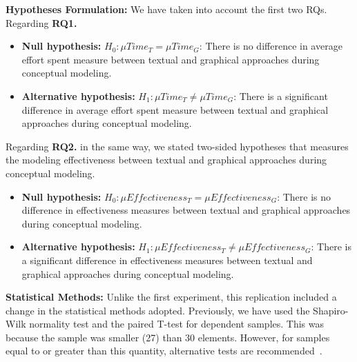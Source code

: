 \textbf{Hypotheses Formulation:} 
We have taken into account the first two RQs. 
Regarding \textbf{RQ1.} 
\begin{itemize}
    \item \textbf{Null hypothesis:} $H_0 : \mu Time_T = \mu Time_G$: There is no difference in average effort spent measure between textual and graphical approaches during conceptual modeling.
    \item \textbf{Alternative hypothesis:} $H_{1} : \mu Time_T \neq \mu Time_G$: There is a significant difference in average effort spent measure between textual and graphical approaches during conceptual modeling.
\end{itemize}
Regarding \textbf{RQ2.} 
in the same way, we stated two-sided hypotheses that measures the modeling effectiveness between textual and graphical approaches during conceptual modeling.
\begin{itemize}
    \item \textbf{Null hypothesis:} $H_0 : \mu Effectiveness_T = \mu Effectiveness_G$: There is no difference in effectiveness measures between textual and graphical approaches during conceptual modeling.
    \item \textbf{Alternative hypothesis:} $H_{1} : \mu Effectiveness_T \neq \mu Effectiveness_G$: There is a significant difference in effectiveness measures between textual and graphical approaches during conceptual modeling.
\end{itemize}

\textbf{Statistical Methods:} Unlike the first experiment, this replication included a change in the statistical methods adopted.
Previously, we have used the Shapiro-Wilk normality test and the paired T-test for dependent samples.
This was because the sample was smaller (27) than 30 elements.
However, for samples equal to or greater than this quantity, alternative tests are recommended~\cite{Triola:2018}.

